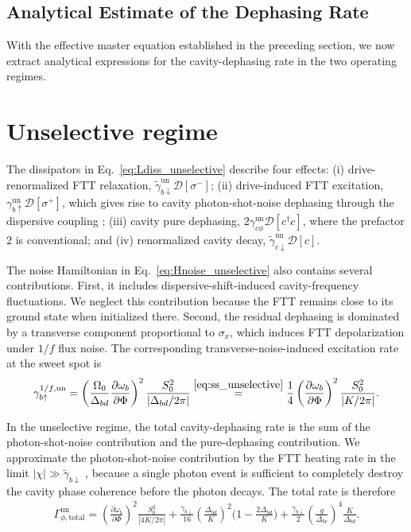\subsection{Analytical Estimate of the Dephasing Rate}
\label{subsec:analytical-dephasing-rate}

With the effective master equation established in the preceding section, we now extract analytical expressions for the cavity-dephasing rate in the two operating regimes.

\section*{Unselective regime}
\label{subsec:unselective_analytical}

The dissipators in Eq.~\eqref{eq:Ldiss_unselective} describe four effects: (i) drive-renormalized FTT relaxation, $\widetilde{\gamma}_{b\downarrow}^{\mathrm{un}}\mathcal{D}[\sigma^-]$; (ii) drive-induced FTT excitation, $\gamma_{b\uparrow}^{\mathrm{un}}\mathcal{D}[\sigma^+]$, which gives rise to cavity photon-shot-noise dephasing through the dispersive coupling \cite{shotnoise,PhysRevA.75.042302Ashphotonshot}; (iii) cavity pure dephasing, $2\gamma_{c\phi}^{\mathrm{un}}\mathcal{D}[c^\dagger c]$, where the prefactor $2$ is conventional; and (iv) renormalized cavity decay, $\widetilde{\gamma}_{c\downarrow}^{\mathrm{un}}\mathcal{D}[c]$.

The noise Hamiltonian in Eq.~\eqref{eq:Hnoise_unselective} also contains several contributions. First, it includes dispersive-shift-induced cavity-frequency fluctuations. We neglect this contribution because the FTT remains close to its ground state when initialized there. Second, the residual dephasing is dominated by a transverse component proportional to $\sigma_x$, which induces FTT depolarization under $1/f$ flux noise. The corresponding transverse-noise-induced excitation rate at the sweet spot is
\begin{equation}
\label{unselective1/f}
\gamma_{b\uparrow}^{1/f,\mathrm{un}}=\left(\frac{\Omega_0}{\Delta_{bd}}\frac{\partial\omega_b}{\partial\Phi}\right)^2\frac{S_0^2}{|\Delta_{bd}/2\pi|}
\overset{\eqref{eq:ss_unselective}}{=}\frac{1}{4}\left(\frac{\partial\omega_b}{\partial\Phi}\right)^2\frac{S_0^2}{|K/2\pi|}.
\end{equation}

In the unselective regime, the total cavity-dephasing rate is the sum of the photon-shot-noise contribution and the pure-dephasing contribution. We approximate the photon-shot-noise contribution by the FTT heating rate in the limit $|\chi| \gg \widetilde{\gamma}_{b\downarrow}$ \cite{serge}, because a single photon event is sufficient to completely destroy the cavity phase coherence before the photon decays. The total rate is therefore
\begin{align}
\label{eq:Gamma_phi_total_unselective}
\Gamma_{\phi,\mathrm{total}}^{\mathrm{un}}
=\left(\frac{\partial\omega_b}{\partial\Phi}\right)^2\frac{S_0^2}{|4K/2\pi|}
+\frac{\gamma_{b\downarrow}}{16}\left(\frac{\Delta_{bd}}{K}\right)^2\bigg(1-\frac{2\Delta_{bd}}{K}\bigg)
+\frac{\gamma_{b\downarrow}}{2}\left(\frac{g}{\Delta_{bc}}\right)^4\frac{K}{\Delta_{bd}}.
\end{align}

